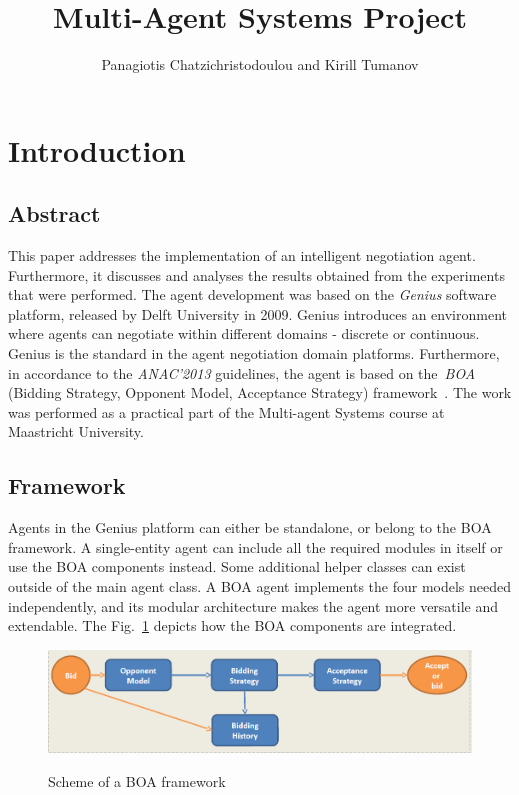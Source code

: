 \documentclass[html]{report}    %
\title{Multi-Agent Systems Project}  %
\author{Panagiotis Chatzichristodoulou and Kirill Tumanov}
\begin{document}

\maketitle                 %
\section{Introduction}
\subsection{Abstract}
This paper addresses the implementation of an intelligent negotiation agent. Furthermore, it discusses and analyses the results obtained from the experiments that were performed. 
The agent development was based on the \textit{Genius} software platform, released by Delft University in 2009. Genius introduces an environment where agents can negotiate within different domains - discrete or continuous. Genius is the standard in the agent negotiation domain platforms. Furthermore, in accordance to the \textit{ANAC'2013} guidelines, the agent is based on the~\textit{BOA} (Bidding Strategy, Opponent Model, Acceptance Strategy) framework~\cite{genius}. The work was performed as a practical part of the Multi-agent Systems course at Maastricht University. 

\subsection{Framework}
Agents in the Genius platform can either be standalone, or belong to the BOA framework. A single-entity agent can include all the required modules in itself or use the BOA components instead. Some additional helper classes can exist outside of the main agent class. A BOA agent implements the four models needed independently, and its modular architecture makes the agent more versatile and extendable. The Fig.~\ref{ANAC BOA} depicts how the BOA components are integrated.
\begin{figure}[htbp]
	  \caption{Scheme of a BOA framework}
	  \centering
	    \includegraphics[width=1\textwidth]{fourmodels}
	  \label{ANAC BOA}
\end{figure}
\end{document}
